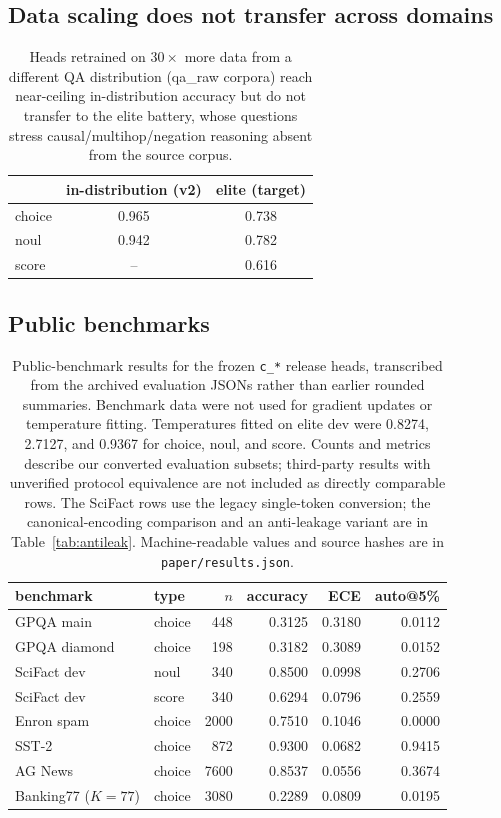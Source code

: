 \documentclass[11pt]{article}
\begin{document}
\subsection{Data scaling does not transfer across domains}
\begin{table}[htbp]
\centering\small
\begin{tabular}{lcc}
\toprule
 & in-distribution (v2) & elite (target) \\
\midrule
choice & 0.965 & 0.738 \\
noul   & 0.942 & 0.782 \\
score  & --    & 0.616 \\
\bottomrule
\end{tabular}
\caption{Heads retrained on $30\times$ more data from a different QA
distribution (qa\_raw corpora) reach near-ceiling in-distribution accuracy
but do not transfer to the elite battery, whose questions stress
causal/multihop/negation reasoning absent from the source corpus.}
\end{table}

\subsection{Public benchmarks}
\begin{table}[htbp]
\centering\small
\begin{tabular}{llrrrr}
\toprule
benchmark & type & $n$ & accuracy & ECE & auto@5\% \\
\midrule
GPQA main       & choice & 448  & 0.3125 & 0.3180 & 0.0112 \\
GPQA diamond    & choice & 198  & 0.3182 & 0.3089 & 0.0152 \\
SciFact dev     & noul   & 340  & 0.8500 & 0.0998 & 0.2706 \\
SciFact dev     & score  & 340  & 0.6294 & 0.0796 & 0.2559 \\
\midrule
Enron spam      & choice & 2000 & 0.7510 & 0.1046 & 0.0000 \\
SST-2           & choice & 872  & 0.9300 & 0.0682 & 0.9415 \\
AG News         & choice & 7600 & 0.8537 & 0.0556 & 0.3674 \\
Banking77 ($K{=}77$) & choice & 3080 & 0.2289 & 0.0809 & 0.0195 \\
\bottomrule
\end{tabular}
\caption{Public-benchmark results for the frozen \texttt{c\_*} release
heads, transcribed from the archived evaluation JSONs rather than earlier
rounded summaries. Benchmark data were not used for gradient updates or
temperature fitting. Temperatures fitted on elite dev were 0.8274,
2.7127, and 0.9367 for choice, noul, and score. Counts and metrics describe
our converted evaluation subsets; third-party results with unverified
protocol equivalence are not included as directly comparable rows.
The SciFact rows use the legacy single-token conversion; the
canonical-encoding comparison and an anti-leakage variant are in
Table~\ref{tab:antileak}. Machine-readable values and source hashes
are in \texttt{paper/results.json}.}
\label{tab:public}
\end{table}
\end{document}
